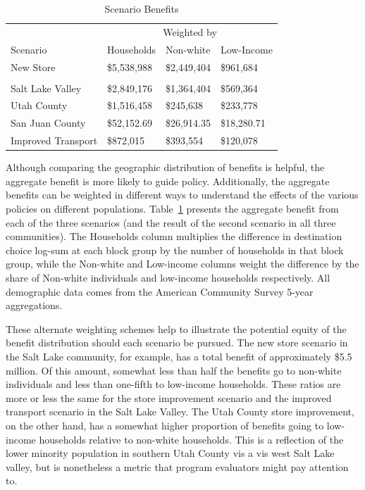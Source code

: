 \documentclass[
  letterpaper,
  DIV=11,
  numbers=noendperiod]{scrreport}
\begin{document}
\hypertarget{tbl-scenarios}{}
\begin{table}
\caption{\label{tbl-scenarios}Scenario Benefits }\tabularnewline

\centering
\begin{tabular}[t]{llll}
\toprule
\multicolumn{1}{c}{ } & \multicolumn{3}{c}{Weighted by} \\
\cmidrule(l{3pt}r{3pt}){2-4}
Scenario & Households & Non-white & Low-Income\\
\midrule
New Store & \$5,538,988 & \$2,449,404 & \$961,684\\
\addlinespace[0.3em]
\multicolumn{4}{l}{\textbf{Improved Store}}\\
\hspace{1em}Salt Lake Valley & \$2,849,176 & \$1,364,404 & \$569,364\\
\hspace{1em}Utah County & \$1,516,458 & \$245,638 & \$233,778\\
\hspace{1em}San Juan County & \$52,152.69 & \$26,914.35 & \$18,280.71\\
Improved Transport & \$872,015 & \$393,554 & \$120,078\\
\bottomrule
\end{tabular}
\end{table}

Although comparing the geographic distribution of benefits is helpful,
the aggregate benefit is more likely to guide policy. Additionally, the
aggregate benefits can be weighted in different ways to understand the
effects of the various policies on different populations.
Table~\ref{tbl-scenarios} presents the aggregate benefit from each of
the three scenarios (and the result of the second scenario in all three
communities). The Households column multiplies the difference in
destination choice log-sum at each block group by the number of
households in that block group, while the Non-white and Low-income
columns weight the difference by the share of Non-white individuals and
low-income households respectively. All demographic data comes from the
American Community Survey 5-year aggregations.

These alternate weighting schemes help to illustrate the potential
equity of the benefit distribution should each scenario be pursued. The
new store scenario in the Salt Lake community, for example, has a total
benefit of approximately \$5.5 million. Of this amount, somewhat less
than half the benefits go to non-white individuals and less than
one-fifth to low-income households. These ratios are more or less the
same for the store improvement scenario and the improved transport
scenario in the Salt Lake Valley. The Utah County store improvement, on
the other hand, has a somewhat higher proportion of benefits going to
low-income households relative to non-white households. This is a
reflection of the lower minority population in southern Utah County vis
a vis west Salt Lake valley, but is nonetheless a metric that program
evaluators might pay attention to.
\end{document}
